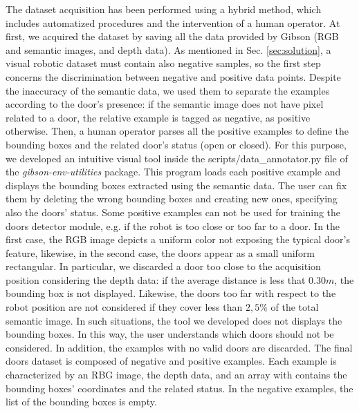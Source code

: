 The dataset acquisition has been performed using a hybrid method, which includes automatized procedures and the intervention of a human operator. At first, we acquired the dataset by saving all the data provided by Gibson (RGB and semantic images, and depth data). As mentioned in Sec. \ref{sec:solution}, a visual robotic dataset must contain also negative samples, so the first step concerns the discrimination between negative and positive data points. Despite the inaccuracy of the semantic data, we used them to separate the examples according to the door's presence: if the semantic image does not have pixel related to a door, the relative example is tagged as negative, as positive otherwise. Then, a human operator parses all the positive examples to define the bounding boxes and the related door's status (open or closed). For this purpose, we developed an intuitive visual tool inside the \textsf{scripts/data\_annotator.py} file of the \textit{gibson-env-utilities} package. This program loads each positive example and displays the bounding boxes extracted using the semantic data. The user can fix them by deleting the wrong bounding boxes and creating new ones, specifying also the doors' status. Some positive examples can not be used for training the doors detector module, e.g. if the robot is too close or too far to a door. In the first case, the RGB image depicts a uniform color not exposing the typical door's feature, likewise, in the second case, the doors appear as a small uniform rectangular. In particular, we discarded a door too close to the acquisition position considering the depth data: if the average distance is less that $0.30 m$, the bounding box is not displayed. Likewise, the doors too far with respect to the robot position are not considered if they cover less than $2,5\%$ of the total semantic image. In such situations, the tool we developed does not displays the bounding boxes. In this way, the user understands which doors should not be considered. In addition, the examples with no valid doors are discarded. The final doors dataset is composed of negative and positive examples. Each example is characterized by an RBG image, the depth data, and an array with contains the bounding boxes' coordinates and the related status. In the negative examples, the list of the bounding boxes is empty.

